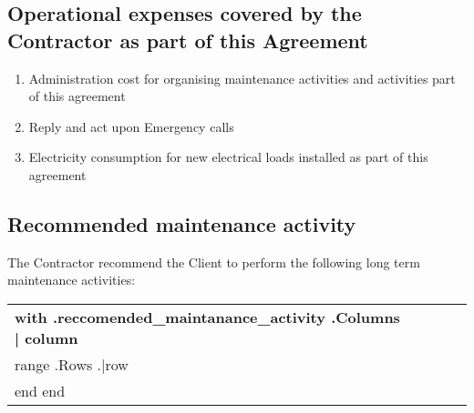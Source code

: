 \subsection{Operational expenses covered by the Contractor as part of this Agreement}
\begin{enumerate}
	\item Administration cost for organising maintenance activities and activities part of this agreement
	\item Reply and act upon Emergency calls
	\item Electricity consumption for new electrical loads installed as part of this agreement
\end{enumerate}


\subsection{Recommended maintenance activity}

The Contractor recommend the Client to perform the following long term
maintenance activities:


\begin{center}
\begin{tabu}{|X[3]|X|X|X|X|} \tabucline{} \rowfont[c]\bfseries
{{with .reccomended_maintanance_activity}} %
	{{.Columns | column}} \\\tabucline{}
	{{range .Rows}} %
	{{.|row}} \\\tabucline{}
	{{end}}
{{end}}
\end{tabu}
\end{center}
